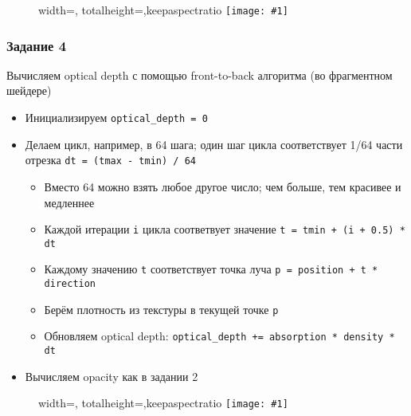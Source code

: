 \documentclass{beamer}
\newcommand{\slideimage}[1]{
  \begin{figure}
    \begin{adjustbox}{width=\textwidth, totalheight=\textheight-2\baselineskip-2\baselineskip,keepaspectratio}
      \texttt{[image: \#1]}
    \end{adjustbox}
  \end{figure}
}
\begin{document}
\begin{frame}[fragile]
\slideimage{3.png}
\end{frame}

\begin{frame}[fragile]
\frametitle{Задание 4}
Вычисляем optical depth с помощью front-to-back алгоритма (во фрагментном шейдере)
\begin{itemize}
\item Инициализируем \verb|optical_depth = 0|
\item Делаем цикл, например, в 64 шага; один шаг цикла соответствует 1/64 части отрезка \verb|dt = (tmax - tmin) / 64|
\begin{itemize}
\item Вместо 64 можно взять любое другое число; чем больше, тем красивее и медленнее
\item Каждой итерации \verb|i| цикла соответвует значение \verb|t = tmin + (i + 0.5) * dt|
\item Каждому значению \verb|t| соответствует точка луча \verb|p = position + t * direction|
\item Берём плотность из текстуры в текущей точке \verb|p|
\item Обновляем optical depth: \verb|optical_depth += absorption * density * dt|
\end{itemize}
\item Вычисляем opacity как в задании 2
\end{itemize}
\end{frame}

\begin{frame}[fragile]
\slideimage{4.png}
\end{frame}
\end{document}
